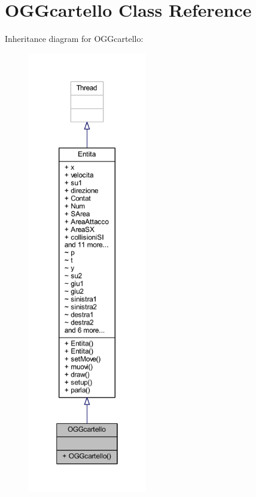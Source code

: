 \hypertarget{classoggetti_1_1_o_g_gcartello}{}\section{O\+G\+Gcartello Class Reference}
\label{classoggetti_1_1_o_g_gcartello}


Inheritance diagram for O\+G\+Gcartello\+:
\nopagebreak
\begin{figure}[H]
\begin{center}
\leavevmode
\includegraphics[height=550pt]{classoggetti_1_1_o_g_gcartello__inherit__graph}
\end{center}
\end{figure}


